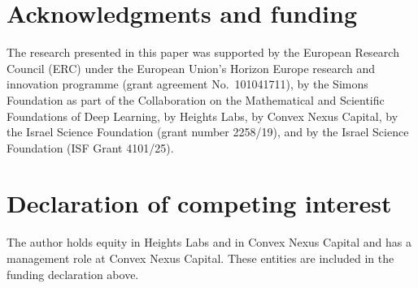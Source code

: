 \documentclass[11pt,reqno]{amsart}
\theoremstyle{plain}
\theoremstyle{definition}
\theoremstyle{remark}
\DeclareMathOperator{\Var}{Var}
\begin{document}
\begin{abstract}
The paper also records mathematics from the same program, including a reduction of the Fourier entropy-influence conjecture: for every Boolean function $H(f)\le 2(I(f)-\Var f)+2U(f)$, where $U$ compares each Fourier weight with the weight above it, so the conjecture is equivalent to $\sup U/I<\infty$. We prove this and a summed restriction criterion that would give the conjecture with an explicit constant.
\end{abstract}

\maketitle

\setcounter{tocdepth}{1}
\tableofcontents















\appendix










\section*{Acknowledgments and funding}
The research presented in this paper was supported by the European Research Council (ERC) under the European Union's Horizon Europe research and innovation programme (grant agreement No.~101041711), by the Simons Foundation as part of the Collaboration on the Mathematical and Scientific Foundations of Deep Learning, by Heights Labs, by Convex Nexus Capital, by the Israel Science Foundation (grant number 2258/19), and by the Israel Science Foundation (ISF Grant 4101/25).

\section*{Declaration of competing interest}
The author holds equity in Heights Labs and in Convex Nexus Capital and has a management role at Convex Nexus Capital. These entities are included in the funding declaration above.
\end{document}

